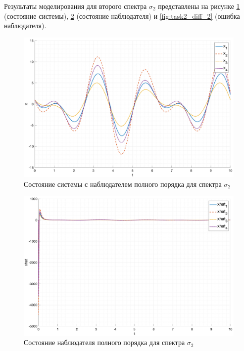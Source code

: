 Результаты моделирования для второго спектра $\sigma_2$ представлены на рисунке \ref{fig:task2_x_2} (состояние системы), \ref{fig:task2_xhat_2} (состояние наблюдателя) и \ref{fig:task2_diff_2} (ошибка наблюдателя).
\begin{figure}[ht!]
    \centering
    \includegraphics[width=\textwidth]{media/plots/task2_x_2.png}
    \caption{Состояние системы с наблюдателем полного порядка для спектра $\sigma_2$}
    \label{fig:task2_x_2}
\end{figure}

\begin{figure}[ht!]
    \centering
    \includegraphics[width=\textwidth]{media/plots/task2_xhat_2.png}
    \caption{Состояние наблюдателя полного порядка для спектра $\sigma_2$}
    \label{fig:task2_xhat_2}
\end{figure}

